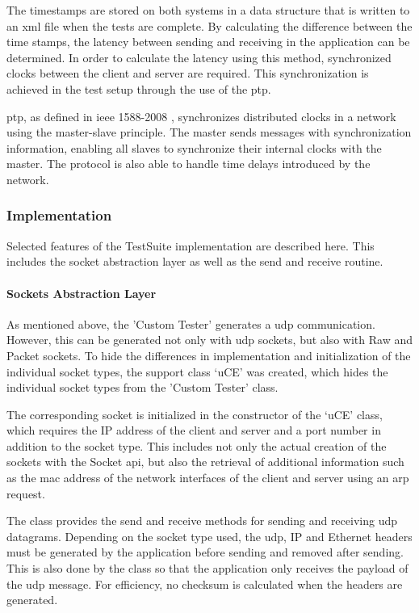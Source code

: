 The timestamps are stored on both systems in a data structure that is written to an \ac{xml} file when the tests are complete. By calculating the difference between the time stamps, the latency between sending and receiving in the application can be determined. In order to calculate the latency using this method, synchronized clocks between the client and server are required. This synchronization is achieved in the test setup through the use of the \ac{ptp}.

\ac{ptp}, as defined in \ac{ieee} 1588-2008 \cite{perf01}, synchronizes distributed clocks in a network using the master-slave principle. The master sends messages with synchronization information, enabling all slaves to synchronize their internal clocks with the master. The protocol is also able to handle time delays introduced by the network.

\subsubsection{Implementation}
Selected features of the TestSuite implementation are described here. This includes the socket abstraction layer as well as the send and receive routine.

\paragraph{Sockets Abstraction Layer}
As mentioned above, the 'Custom Tester' generates a \ac{udp} communication. However, this can be generated not only with \ac{udp} sockets, but also with Raw and Packet sockets. To hide the differences in implementation and initialization of the individual socket types, the support class `uCE' was created, which hides the individual socket types from the 'Custom Tester' class.

The corresponding socket is initialized in the constructor of the `uCE' class, which requires the IP address of the client and server and a port number in addition to the socket type. This includes not only the actual creation of the sockets with the Socket \ac{api}, but also the retrieval of additional information such as the \ac{mac} address of the network interfaces of the client and server using an \ac{arp} request.

The class provides the send and receive methods for sending and receiving \ac{udp} datagrams. Depending on the socket type used, the \ac{udp}, IP and Ethernet headers must be generated by the application before sending and removed after sending. This is also done by the class so that the application only receives the payload of the \ac{udp} message. For efficiency, no checksum is calculated when the headers are generated.

